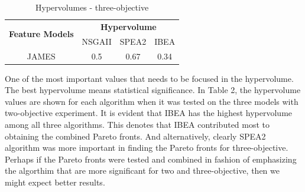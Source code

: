 \documentclass[a4paper,12pt]{article}
\begin{document}
\begin{table}[h!]
\centering
\begin{tabular}{|c|c|c|c|}
\hline
\multirow{2}{*}{\textbf{Feature Models}} & \multicolumn{3}{c|}{\textbf{Hypervolume}} \\ \cline{2-4} 
                                         & NSGAII        & SPEA2        & IBEA       \\ \hline
JAMES                                    & 0.5           & 0.67         & 0.34       \\ \hline
\end{tabular}
\caption{Hypervolumes - three-objective}
\label{table:computerNo}
\end{table}

One of the most important values that needs to be focused in the hypervolume. The best hypervolume means statistical significance. In Table 2, the hypervolume values are shown for each algorithm when it was tested on the three models with two-objective experiment. It is evident that IBEA has the highest hypervolume among all three algorithms. This denotes that IBEA contributed most to obtaining the combined Pareto fronts. And alternatively, clearly SPEA2 algorithm was more important in finding the Pareto fronts for three-objective. Perhaps if the Pareto fronts were tested and combined in fashion of emphasizing the algorthim that are more significant for two and three-objective, then we might expect better results.


\newpage
\printbibliography
\end{document}
